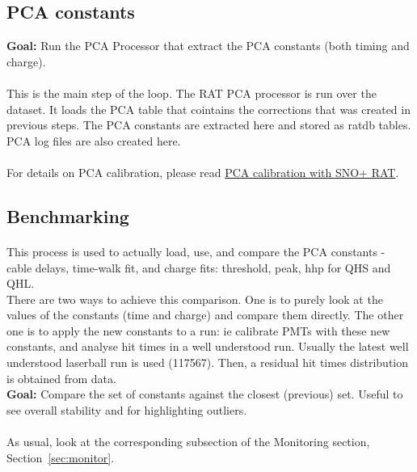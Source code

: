 \documentclass[12pt]{article}
\begin{document}
\clearpage

\subsection{PCA constants}\label{sub:pca_cons}
\textbf{Goal:} Run the PCA Processor that extract the PCA constants (both timing and charge).

\paragraph{}
This is the main step of the loop. The RAT PCA processor is run over the dataset. It loads the PCA table that cointains the corrections that was created in previous steps. The PCA constants are extracted here and stored as ratdb tables. PCA log files are also created here. 

\paragraph{}
For details on PCA calibration, please read \href{https://www.snolab.ca/snoplus/private/DocDB/cgi/ShowDocument?docid=1987}{PCA calibration with SNO+ RAT}.

\subsection{Benchmarking}\label{sub:bench}
\paragraph{}
This process is used to actually load, use, and compare the PCA constants - cable delays, time-walk fit, and charge fits: threshold, peak, hhp for QHS and QHL.\\
There are two ways to achieve this comparison. One is to purely look at the values of the constants (time and charge) and compare them directly. The other one is to apply the new constants to a run: ie calibrate PMTs with these new constants, and analyse hit times in a well understood run. Usually the latest well understood laserball run is used (117567). Then, a residual hit times distribution is obtained from data.\\
\textbf{Goal:} Compare the set of constants against the closest (previous) set. Useful to see overall stability and for highlighting outliers.

\paragraph{}
As usual, look at the corresponding subsection of the Monitoring section, Section~\ref{sec:monitor}.
\end{document}
